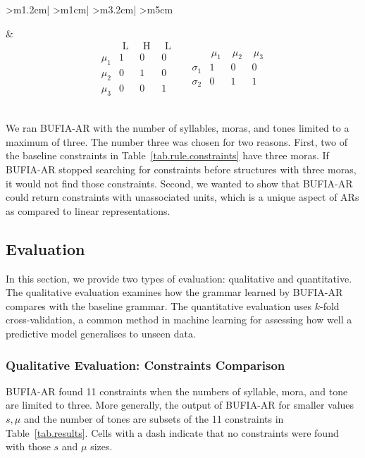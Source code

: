 \documentclass{CUP-JNL-PHO}%
\theoremstyle{definition}
\numberwithin{equation}{section}
\theoremstyle{definition}
\begin{document}
\begin{table}[ht]
\begin{tabular}{
			>{\centering\arraybackslash}m{1.2cm}|
			>{\centering\arraybackslash}m{1cm}|
			>{\centering\arraybackslash}m{3.2cm}|
			>{\centering\arraybackslash}m{5cm}
		}
\begin{tikzpicture}[scale=.85,every node/.style={scale=.85}]
			\draw (t0)--(c1)--(s1);
			\draw (t1)--(c2)--(s2);
			\draw (t2)--(c3)--(s2);
		\end{tikzpicture}
		&
		\[
		\begin{array}{c|ccc}
			& \text{ L } & \text{ H } & \text{ L }\\
			\hline
			\mu_1 & 1 & 0 & 0\\
			\mu_2 & 0 & 1 & 0\\
			\mu_3 & 0 & 0 & 1
		\end{array}
		\quad
		\begin{array}{c|ccc}
			& \,\mu_1\, &\,\mu_2 \,& \,\mu_3\,\\
			\hline
			\sigma_1 & 1 & 0 & 0\\
			\sigma_2 & 0 & 1 & 1
		\end{array}
		\]
		\\		\bottomrule
	\end{tabular}
	
	\caption{Corresponding lexical forms, ARs, and their matrix-based encodings.}
	\label{tab.conversion}
\end{table}

We ran BUFIA-AR with the number of syllables,
moras, and tones limited to a maximum of three. 
The number three was chosen for two reasons. 
First, two of the baseline constraints in
Table~\ref{tab.rule.constraints} have three moras. 
If BUFIA-AR stopped searching for constraints before 
structures with three moras, it would not find those 
constraints. Second, we wanted to show that BUFIA-AR 
could return constraints with unassociated units, which 
is a unique aspect of ARs as compared to linear 
representations.

\subsection{Evaluation}
In this section, we provide two types of evaluation: qualitative and 
quantitative. The qualitative evaluation examines how the grammar learned 
by BUFIA-AR compares with the baseline grammar. The quantitative 
evaluation uses $k$-fold cross-validation,
a common method in machine learning for assessing 
how well a predictive model generalises to unseen data. 
\subsubsection{Qualitative Evaluation: Constraints Comparison}
BUFIA-AR found 11 constraints when the numbers of 
syllable, mora, and tone are limited to three. 
More generally, the output of BUFIA-AR for smaller 
values $s,\mu$ and the number of tones are subsets 
of the 11 constraints in Table~\ref{tab.results}. 
Cells with a dash indicate that no constraints were 
found with those $s$ and $\mu$ sizes.  
\end{document}
